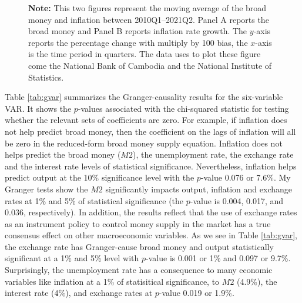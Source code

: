\documentclass[11pt]{article}
\begin{document}
\begin{figure}[H]
\begin{subfigure}[b]{0.5\linewidth}
    \end{subfigure}
    \begin{tablenotes}
        \footnotesize
        \item \textbf{Note:} This two figures represent the moving average of the broad money and inflation between 2010Q1--2021Q2. Panel A reports the broad money and Panel B reports inflation rate growth. The $y$-axis reports the percentage change with multiply by 100 bias, the $x$-axis is the time period in quarters. The data uses to plot these figure come the National Bank of Cambodia and the National Institute of Statistics.  
    \end{tablenotes} 
    
\end{figure}

Table \ref{tab:gvar} summarizes the Granger-causality results for the six-variable VAR. It shows the $p$-values associated with the chi-squared statistic for testing whether the relevant sets of coefficients are zero. For example, if inflation does not help predict broad money, then the coefficient on the lags of inflation will all be zero in the reduced-form broad money supply equation. Inflation does not helps predict the broad money ($M2$), the unemployment rate, the exchange rate and the interest rate levels of statistical significance. Nevertheless, inflation helps predict output at the 10\% significance level with the $p$-value 0.076 or 7.6\%. My Granger tests show the $M2$ significantly impacts output, inflation and exchange rates at 1\% and 5\% of statistical significance (the $p$-value is 0.004, 0.017, and 0.036, respectively). In addition, the results reflect that the use of exchange rates as an instrument policy to control money supply in the market has a true consensus effect on other macroeconomic variables. As we see in Table \ref{tab:gvar}, the exchange rate has Granger-cause broad money and output statistically significant at a 1\% and 5\% level with $p$-value is 0.001 or 1\% and 0.097 or 9.7\%. Surprisingly, the unemployment rate has a consequence to many economic variables like inflation at a 1\% of statisitical significance, to $M2$ (4.9\%), the interest rate (4\%), and exchange rates at $p$-value 0.019 or 1.9\%. 


\clearpage\newpage


\end{document}
